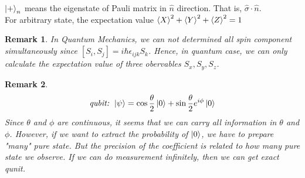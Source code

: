 \documentclass[]{article}
\newtheorem*{remark}{Remark}
\theoremstyle{nonumberplain}
\begin{document}
$\ket{+}_{n}$ means the eigenstate of Pauli matrix in $\hat{n}$ direction. That is, $\hat{\sigma} \cdot \hat{n}$. \\
For arbitrary state, the expectation value $\braket{X}^{2}+\braket{Y}^{2}+\braket{Z}^{2}=1$
\begin{remark}
	In Quantum Mechanics, we can not determined all spin component simultaneously since $[S_{i},S_{j}]=i\hbar\epsilon_{ijk}S_{k}$. Hence, in quantum case, we can only calculate the expectation value of three obervables $S_{x},S_{y},S_{z}$.
\end{remark}
\begin{remark}
\\
\[
	\textit{qubit: } \ket{\psi} = \cos{\frac{\theta}{2}}\ket{0}+\sin{\frac{\theta}{2}}e^{i\phi}\ket{0}
\] 
Since $\theta$ and $\phi$ are continuous, it seems that we can carry all information in $\theta$ and $\phi$. However, if we want to extract the probability of $\ket{0}$, we have to prepare "many" pure state. But the precision of the coefficient is related to how many pure state we observe. If we can do measurement infinitely, then we can get exact qunit.  
\end{remark}
\end{document}
